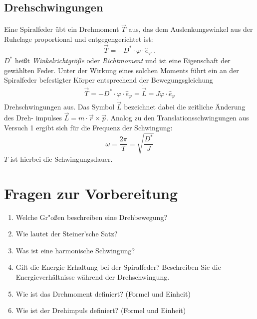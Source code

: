 \subsection{Drehschwingungen}

Eine Spiralfeder übt ein Drehmoment $\vec{T}$ aus, das dem Auslenkungswinkel aus der Ruhelage proportional und entgegengerichtet ist:
\begin{equation}
 \vec{T} = -D^*\cdot\varphi\cdot \hat{e}_{\varphi} \; .
\end{equation}
$D^*$ heißt \textit{Winkelrichtgröße} oder \textit{Richtmoment} und ist eine Eigenschaft der gewählten Feder. Unter der Wirkung eines solchen Moments führt ein an der Spiralfeder befestigter Körper entsprechend der Bewegungsgleichung
\begin{equation}
 \vec{T} = -D^*\cdot\varphi\cdot \hat{e}_{\varphi} = \dot{\vec{L}} = J\ddot{\varphi}\cdot\hat{e}_{\varphi}
\end{equation}
Drehschwingungen aus. Das Symbol $\dot{\vec{L}}$ bezeichnet dabei die zeitliche Änderung des Dreh- impulses $\vec{L} = m\cdot \vec{r}\times\vec{p}$. Analog zu den Translationsschwingungen aus Versuch 1 ergibt sich für die Frequenz der Schwingung:
\begin{equation}
 \omega = \frac{2\pi}{T} = \sqrt{\frac{D^*}{J}}
\end{equation}
$T$ ist hierbei die Schwingungsdauer.

\section{Fragen zur Vorbereitung}

\begin{enumerate} 
 \item Welche Gr"o{\ss}en beschreiben eine Drehbewegung?
 \item Wie lautet der Steiner'sche Satz?
 \item Was ist eine harmonische Schwingung?
 \item Gilt die Energie-Erhaltung bei der Spiralfeder? Beschreiben Sie die Energieverhältnisse während der Drehschwingung.
 \item Wie ist das Drehmoment definiert? (Formel und Einheit)
 \item Wie ist der Drehimpuls definiert? (Formel und Einheit)
\end{enumerate} 

